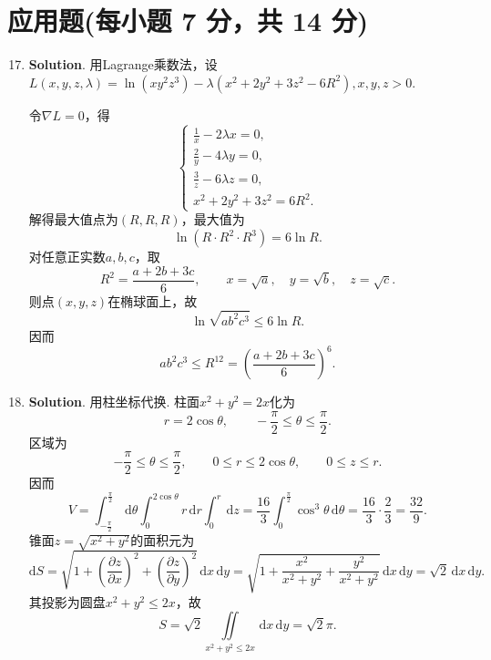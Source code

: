 \documentclass[../main.tex]{subfiles}
\begin{document}
\section{应用题(每小题 7 分，共 14 分)}
\begin{enumerate}
    \setcounter{enumi}{16}
    \item \textbf{Solution}. 用Lagrange乘数法，设$L(x,y,z,\lambda)=\ln(xy^2z^3)-\lambda(x^2+2y^2+3z^2-6R^2),x,y,z>0$.

          令$\nabla L=0$，得
          \[
              \begin{cases}
                  \frac{1}{x}-2\lambda x=0, \\[6pt]
                  \frac{2}{y}-4\lambda y=0, \\[6pt]
                  \frac{3}{z}-6\lambda z=0, \\[6pt]
                  x^2+2y^2+3z^2=6R^2.
              \end{cases}
          \]
          解得最大值点为$(R,R,R)$，最大值为
          \[
              \ln(R\cdot R^2\cdot R^3)=6\ln R.
          \]
          对任意正实数$a,b,c$，取
          \[
              R^2=\frac{a+2b+3c}{6},\qquad x=\sqrt a,\quad y=\sqrt b,\quad z=\sqrt c.
          \]
          则点$(x,y,z)$在椭球面上，故
          \[
              \ln\sqrt{ab^2c^3}\le 6\ln R.
          \]
          因而
          \[
              ab^2c^3\le R^{12}=\left(\frac{a+2b+3c}{6}\right)^6.
          \]

    \item \textbf{Solution}. 用柱坐标代换. 柱面$x^2+y^2=2x$化为
          \[
              r=2\cos\theta,\qquad -\frac{\pi}{2}\le\theta\le\frac{\pi}{2}.
          \]
          区域为
          \[
              -\frac{\pi}{2}\le\theta\le\frac{\pi}{2},\qquad 0\le r\le2\cos\theta,\qquad 0\le z\le r.
          \]
          因而
          \[
              V=\int_{-\frac{\pi}{2}}^{\frac{\pi}{2}}\,\mathrm{d}\theta\int_0^{2\cos\theta}r\,\mathrm{d}r\int_0^r \,\mathrm{d}z
              =\frac{16}{3}\int_{0}^{\frac{\pi}{2}}\cos^3\theta\,\mathrm{d}\theta=\frac{16}{3}\cdot\frac{2}{3}=\frac{32}{9}.
          \]
          锥面$z=\sqrt{x^2+y^2}$的面积元为
          \[
              \mathrm{d}S=\sqrt{1+\left(\frac{\partial z}{\partial x}\right)^2+\left(\frac{\partial z}{\partial y}\right)^2}\,\mathrm{d}x\,\mathrm{d}y=\sqrt{1+\frac{x^2}{x^2+y^2}+\frac{y^2}{x^2+y^2}}\,\mathrm{d}x\,\mathrm{d}y=\sqrt2\,\mathrm{d}x\,\mathrm{d}y.
          \]
          其投影为圆盘$x^2+y^2\le2x$，故
          \[
              S=\sqrt2\iint\limits_{x^2+y^2\le2x}\,\mathrm{d}x\,\mathrm{d}y=\sqrt2\pi.
          \]

\end{enumerate}
\end{document}

